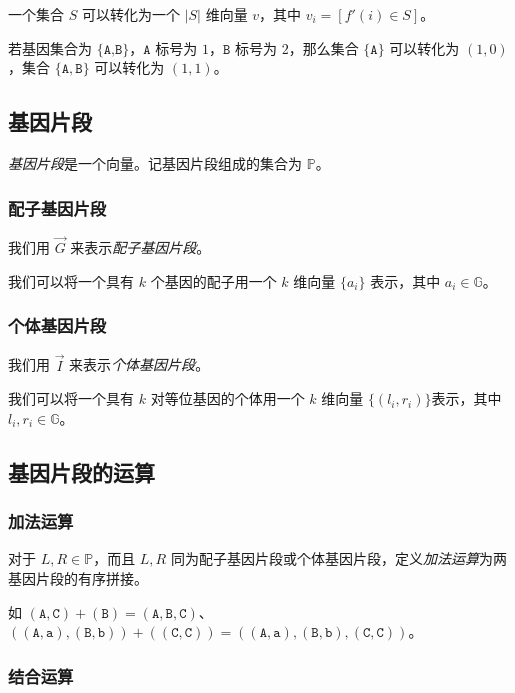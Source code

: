\documentclass{article}
\begin{document}
一个集合 $S$ 可以转化为一个 $|S|$ 维向量 $v$，其中 $v_i=[f'(i) \in S]$。

若基因集合为 $\{\texttt{A,B}\}$，$\texttt{A}$ 标号为 $1$，$\texttt{B}$ 标号为 $2$，那么集合 $\{\texttt{A}\}$ 可以转化为 $(1,0)$，集合 $\{\texttt{A},\texttt{B}\}$ 可以转化为 $(1,1)$。

\subsection{基因片段}

\textsl{基因片段}是一个向量。记基因片段组成的集合为 $\mathbb{P}$。

\subsubsection*{配子基因片段}

我们用 $\vec G$ 来表示\textsl{配子基因片段}。

我们可以将一个具有 $k$ 个基因的配子用一个 $k$ 维向量 $\{a_i\}$ 表示，其中 $a_i \in \mathbb{G}$。

\subsubsection*{个体基因片段}

我们用 $\vec I$ 来表示\textsl{个体基因片段}。

我们可以将一个具有 $k$ 对等位基因的个体用一个 $k$ 维向量 $\{(l_i,r_i)\}$表示，其中 $l_i,r_i \in \mathbb{G}$。

\subsection{基因片段的运算}

\subsubsection*{加法运算}

对于 $L,R \in \mathbb{P}$，而且 $L,R$ 同为配子基因片段或个体基因片段，定义\textsl{加法运算}为两基因片段的有序拼接。

如 $(\texttt{A},\texttt{C}) + (\texttt{B}) = (\texttt{A},\texttt{B},\texttt{C})$、$((\texttt{A},\texttt{a}),(\texttt{B},\texttt{b}))+((\texttt{C},\texttt{C}))=((\texttt{A},\texttt{a}),(\texttt{B},\texttt{b}),(\texttt{C},\texttt{C}))$。

\subsubsection*{结合运算}
\end{document}
